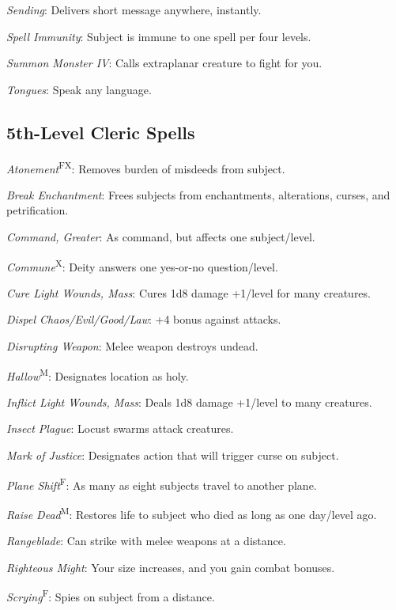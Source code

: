 \textit{Sending}: Delivers short message anywhere, instantly.

\textit{Spell Immunity}: Subject is immune to one spell per four levels.

\textit{Summon Monster IV}: Calls extraplanar creature to fight for you.

\textit{Tongues}: Speak any language.



\subsection{5th-Level Cleric Spells}

\textit{Atonement}\textsuperscript{FX}: Removes burden of misdeeds from subject.

\textit{Break Enchantment}: Frees subjects from enchantments, alterations, curses, and petrification.

\textit{Command, Greater}: As command, but affects one subject/level.

\textit{Commune}\textsuperscript{X}: Deity answers one yes-or-no question/level.

\textit{Cure Light Wounds, Mass}: Cures 1d8 damage +1/level for many creatures.

\textit{Dispel Chaos/Evil/Good/Law}: +4 bonus against attacks.

\textit{Disrupting Weapon}: Melee weapon destroys undead.


\textit{Hallow}\textsuperscript{M}: Designates location as holy.

\textit{Inflict Light Wounds, Mass}: Deals 1d8 damage +1/level to many creatures.

\textit{Insect Plague}: Locust swarms attack creatures.

\textit{Mark of Justice}: Designates action that will trigger curse on subject.

\textit{Plane Shift}\textsuperscript{F}: As many as eight subjects travel to another plane.

\textit{Raise Dead}\textsuperscript{M}: Restores life to subject who died as long as one day/level ago.

\textit{Rangeblade}: Can strike with melee weapons at a distance.

\textit{Righteous Might}: Your size increases, and you gain combat bonuses.

\textit{Scrying}\textsuperscript{F}: Spies on subject from a distance.

